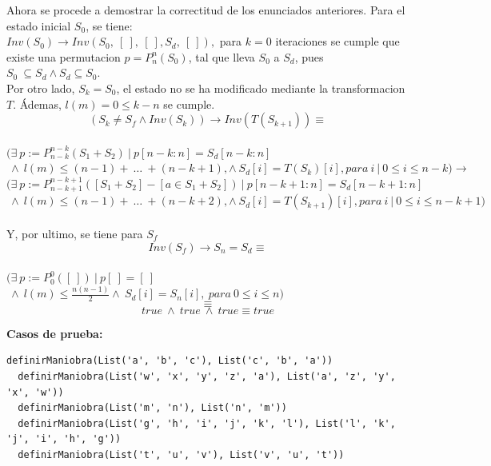 \documentclass[12pt, a4paper]{article}
\begin{document}
Ahora se procede a demostrar la correctitud de los enunciados anteriores. Para el estado inicial $S_0$, se tiene: \\

$Inv(S_0) \rightarrow Inv(S_0,~[~],~[~], S_d,~[~]),$ para $k = 0$ iteraciones se cumple que existe
una permutacion $p = P_n^n(S_0)$, tal que lleva $S_0$ a $S_d$, pues $S_0~\subseteq S_d \land S_d \subseteq S_0$. \\
Por otro lado, $S_k = S_0$, el estado no se ha modificado mediante la transformacion $T$. Ádemas, $l(m) = 0 \leq k-n$ se cumple. \\
\[( S_k \neq S_f \land Inv(S_k)) \rightarrow Inv(T(S_{k+1})) \equiv \]\\

$(\exists~p := P_{n-k}^{n-k} ( S_1  + S_2)~|~p[n-k:n] = S_d[n-k:n]$ $~\land~l(m) \leq (n-1) +~\ldots~+ (n-k+1), \land ~S_d[i] = T(S_k)[i],para~ i~|~0 \leq i \leq n-k) \rightarrow$ \\
$(\exists~p := P_{n-k+1}^{n-k+1} ([S_1+ S_2]-[a \in S_1 + S_2])~|~p[n-k+1:n] = S_d[n-k+1:n]$ $~\land~l(m) \leq (n-1) +~\ldots~+ (n-k+2), \land ~S_d[i] = T(S_{k+1})[i],para~ i~|~0 \leq i \leq n-k+1)$ \\ \\
Y, por ultimo, se tiene para $S_f$ \\
\[Inv(S_f) \rightarrow S_n = S_d \equiv\] \\
$(\exists~p := P_0^0 ([~])~|~p[~] = [~]$ $~\land~l(m) \leq \frac{n(n-1)}{2} \land ~S_d[i] = S_{n}[i], ~para~0 \leq i \leq n)$  \\
\[
\equiv
\]
\[true~\land~true~\land~true  \equiv true \]


\textbf{Casos de prueba: } \\
\begin{lstlisting}[caption=Para ver los valores esperados por favor referirse al archivo de pruebas.sc. Debido a que los resultados son tan extensos que dañan la estructura del documento., label=lst:scala_code]
  definirManiobra(List('a', 'b', 'c'), List('c', 'b', 'a'))
  definirManiobra(List('w', 'x', 'y', 'z', 'a'), List('a', 'z', 'y', 'x', 'w'))
  definirManiobra(List('m', 'n'), List('n', 'm'))
  definirManiobra(List('g', 'h', 'i', 'j', 'k', 'l'), List('l', 'k', 'j', 'i', 'h', 'g'))
  definirManiobra(List('t', 'u', 'v'), List('v', 'u', 't'))
  \end{lstlisting}
\end{document}
